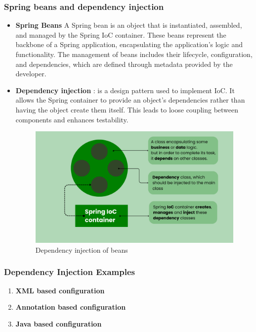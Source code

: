 \documentclass{article}
\begin{document}
\subsubsection{Spring beans and dependency injection}
\begin{itemize}
    \item \textbf{Spring Beans} 
    A Spring bean is an object that is instantiated, assembled, and managed by the Spring IoC container. These beans represent the backbone of a Spring application, encapsulating the application's logic and functionality. The management of beans includes their lifecycle, configuration, and dependencies, which are defined through metadata provided by the developer.

    \item \textbf{Dependency injection} : is a design pattern used to implement IoC. It allows the Spring container to provide an object’s dependencies rather than having the object create them itself. This leads to loose coupling between components and enhances testability.

\begin{figure}[H]
    \centering
    \begin{framed}
        \includegraphics[width=0.9\linewidth]{images/dependency_injection.png}
    \end{framed}
    \caption{Dependency injection of beans}
    \label{fig:spring-ioc-container}
\end{figure}
    

\end{itemize}




\subsubsection{Dependency Injection Examples}
\begin{enumerate} 
    \item \textbf{XML based configuration}\label{sec:ioc-xml-config}
    
    \item \textbf{Annotation based configuration}\label{sec:ioc-annotation-config}

    \item \textbf{Java based configuration}\label{sec:ioc-java-config}
\end{enumerate}
    
\end{document}
